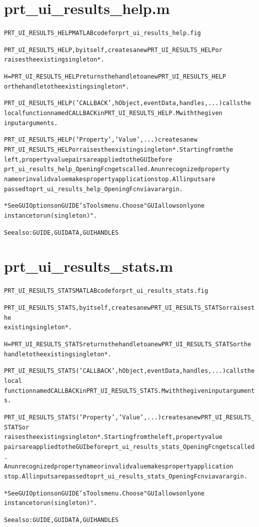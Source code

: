 \section{prt\_ui\_results\_help.m}
\begin{alltt}

 PRT\_UI\_RESULTS\_HELP MATLAB code for prt\_ui\_results\_help.fig
 
 PRT\_UI\_RESULTS\_HELP, by itself, creates a new PRT\_UI\_RESULTS\_HELP or 
 raises the existing singleton*.
 
 H = PRT\_UI\_RESULTS\_HELP returns the handle to a new PRT\_UI\_RESULTS\_HELP 
 or the handle to the existing singleton*.
 
 PRT\_UI\_RESULTS\_HELP('CALLBACK',hObject,eventData,handles,...) calls the 
 local function named CALLBACK in PRT\_UI\_RESULTS\_HELP.M with the given 
 input arguments.
 
 PRT\_UI\_RESULTS\_HELP('Property','Value',...) creates a new 
 PRT\_UI\_RESULTS\_HELP or raises the existing singleton*.  Starting from the
 left, property value pairs are applied to the GUI before 
 prt\_ui\_results\_help\_OpeningFcn gets called.  An unrecognized property 
 name or invalid value makes property application stop.  All inputs are 
 passed to prt\_ui\_results\_help\_OpeningFcn via varargin.
 
 *See GUI Options on GUIDE's Tools menu.  Choose "GUI allows only one
 instance to run (singleton)".
 
 See also: GUIDE, GUIDATA, GUIHANDLES
\end{alltt}


\section{prt\_ui\_results\_stats.m}
\begin{alltt}

 PRT\_UI\_RESULTS\_STATS MATLAB code for prt\_ui\_results\_stats.fig
 
 PRT\_UI\_RESULTS\_STATS, by itself, creates a new PRT\_UI\_RESULTS\_STATS or raises the
 existing singleton*.
 
 H = PRT\_UI\_RESULTS\_STATS returns the handle to a new PRT\_UI\_RESULTS\_STATS or the
 handle to the existing singleton*.
 
 PRT\_UI\_RESULTS\_STATS('CALLBACK',hObject,eventData,handles,...) calls the local
 function named CALLBACK in PRT\_UI\_RESULTS\_STATS.M with the given input arguments.
 
 PRT\_UI\_RESULTS\_STATS('Property','Value',...) creates a new PRT\_UI\_RESULTS\_STATS or
 raises the existing singleton*.  Starting from the left, property value
 pairs are applied to the GUI before prt\_ui\_results\_stats\_OpeningFcn gets called.
 An unrecognized property name or invalid value makes property application
 stop.  All inputs are passed to prt\_ui\_results\_stats\_OpeningFcn via varargin.
 
 *See GUI Options on GUIDE's Tools menu.  Choose "GUI allows only one
 instance to run (singleton)".
 
 See also: GUIDE, GUIDATA, GUIHANDLES
\end{alltt}


